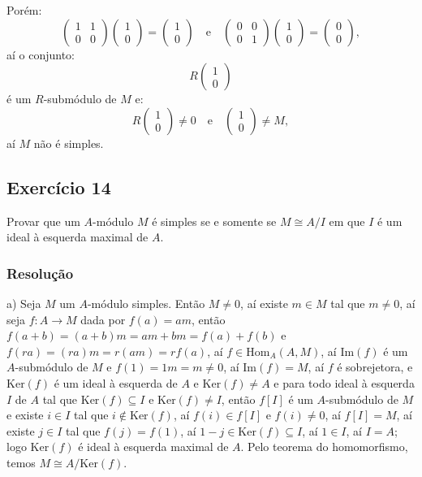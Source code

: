 \documentclass[10pt,a4paper]{article}
\begin{document}
\medskip
\noindent
Porém:
\[
\begin{pmatrix}
1&1\\0&0
\end{pmatrix}\begin{pmatrix}
1\\0
\end{pmatrix}=\begin{pmatrix}
1\\0
\end{pmatrix}\quad\text{e}\quad\begin{pmatrix}
0&0\\0&1
\end{pmatrix}\begin{pmatrix}
1\\0
\end{pmatrix}=\begin{pmatrix}
0\\0
\end{pmatrix},
\]
aí o conjunto:
\[
R\begin{pmatrix}
1\\0
\end{pmatrix}
\]
é um $R$-submódulo de $M$ e:
\[
R\begin{pmatrix}
1\\0
\end{pmatrix}\neq 0\quad\text{e}\quad\begin{pmatrix}
1\\0
\end{pmatrix}\neq M,
\]
aí $M$ não é simples.

\subsection*{Exercício 14}

Provar que um $A$-módulo $M$ é simples se e somente se $M\cong A/I$ em que $I$ é um ideal à esquerda maximal de $A$.

\subsubsection*{Resolução}

a) Seja $M$ um $A$-módulo simples. Então $M\neq 0$, aí existe $m\in M$ tal que $m\neq 0$, aí seja $f:A\rightarrow M$ dada por $f(a)=am$, então $f(a+b)=(a+b)m=am+bm=f(a)+f(b)$ e $f(ra)=(ra)m=r(am)=rf(a)$, aí $f\in\mathrm{Hom}_A(A,M)$, aí $\mathrm{Im}(f)$ é um $A$-submódulo de $M$ e $f(1)=1m=m\neq 0$, aí $\mathrm{Im}(f)=M$, aí $f$ é sobrejetora, e $\mathrm{Ker}(f)$ é um ideal à esquerda de $A$ e $\mathrm{Ker}(f)\neq A$ e para todo ideal à esquerda $I$ de $A$ tal que $\mathrm{Ker}(f)\subseteq I$ e $\mathrm{Ker}(f)\neq I$, então $f[I]$ é um $A$-submódulo de $M$ e existe $i\in I$ tal que $i\notin\mathrm{Ker}(f)$, aí $f(i)\in f[I]$ e $f(i)\neq 0$, aí $f[I]=M$, aí existe $j\in I$ tal que $f(j)=f(1)$, aí $1-j\in\mathrm{Ker}(f)\subseteq I$, aí $1\in I$, aí $I=A$; logo $\mathrm{Ker}(f)$ é ideal à esquerda maximal de $A$. Pelo teorema do homomorfismo, temos $M\cong A/\mathrm{Ker}(f)$.
\end{document}
